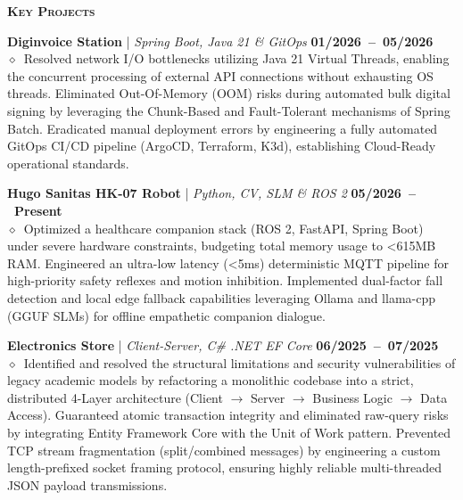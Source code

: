 \documentclass[11pt, a4paper]{article}
\newcommand{\dates}[1]{\hfill\mbox{\textbf{#1}}}
\newcommand{\is}{\par\vspace*{0.1ex}}
\newcommand{\smaller}[1]{{\small$\diamond$\ #1}}
\newcommand{\headright}[1]{\vspace*{0.4ex}\textsc{\Large\color{cvblue}\textbf{#1}}\par%
     \vspace*{-1.2ex}{\color{cvblue}\hrulefill}\par\vspace*{0.2ex}}
\begin{document}
\begin{minipage}[t]{0.59\textwidth}
\headright{Key Projects}
\is
\textbf{Diginvoice Station} | \textit{Spring Boot, Java 21 \& GitOps} \hfill \dates{01/2026 -- 05/2026} \\
\smaller{Resolved network I/O bottlenecks utilizing Java 21 Virtual Threads, enabling the concurrent processing of external API connections without exhausting OS threads. Eliminated Out-Of-Memory (OOM) risks during automated bulk digital signing by leveraging the Chunk-Based and Fault-Tolerant mechanisms of Spring Batch. Eradicated manual deployment errors by engineering a fully automated GitOps CI/CD pipeline (ArgoCD, Terraform, K3d), establishing Cloud-Ready operational standards.}
\is
\textbf{Hugo Sanitas HK-07 Robot} | \textit{Python, CV, SLM \& ROS 2} \hfill \dates{05/2026 -- Present} \\
\smaller{Optimized a healthcare companion stack (ROS 2, FastAPI, Spring Boot) under severe hardware constraints, budgeting total memory usage to <615MB RAM. Engineered an ultra-low latency (<5ms) deterministic MQTT pipeline for high-priority safety reflexes and motion inhibition. Implemented dual-factor fall detection and local edge fallback capabilities leveraging Ollama and llama-cpp (GGUF SLMs) for offline empathetic companion dialogue.}
\is
\textbf{Electronics Store} | \textit{Client-Server, C\# .NET EF Core} \hfill \dates{06/2025 -- 07/2025} \\
\smaller{Identified and resolved the structural limitations and security vulnerabilities of legacy academic models by refactoring a monolithic codebase into a strict, distributed 4-Layer architecture (Client $\rightarrow$ Server $\rightarrow$ Business Logic $\rightarrow$ Data Access). Guaranteed atomic transaction integrity and eliminated raw-query risks by integrating Entity Framework Core with the Unit of Work pattern. Prevented TCP stream fragmentation (split/combined messages) by engineering a custom length-prefixed socket framing protocol, ensuring highly reliable multi-threaded JSON payload transmissions.}


\end{minipage}
\end{document}

